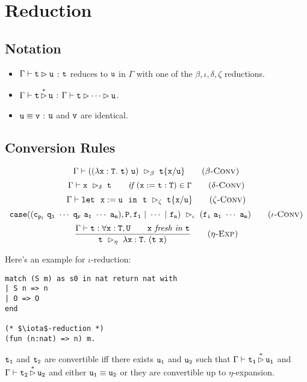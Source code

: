 \section{Reduction}

\subsection{Notation}
\begin{itemize}
    \item $\Gamma\vdash \tt t\rhd u$ : $\tt t$ reduces to $\tt u$ in $\Gamma$ with 
    one of the $\beta,\iota,\delta,\zeta$ reductions.
    \item $\Gamma\vdash \tt t\mathop{\rhd}\limits^* u$ : $\Gamma\vdash\tt t\rhd\cdots\rhd u$.
    \item $\tt u\equiv v$ : $\tt u$ and $\tt v$ are identical.
\end{itemize}

\subsection{Conversion Rules}
\begin{equation*}
    \Gamma\vdash\tt((\lambda x:T.\ t)\ u)\ \rhd_\beta\ t\{x/u\}
    \tag{\sc $\beta$-Conv}
\end{equation*}
\begin{equation*}
    \Gamma\vdash\tt x\ \rhd_\delta\ t\qquad \textit{if }(x:=t:T)\in\Gamma
    \tag{\sc $\delta$-Conv}
\end{equation*}
\begin{equation*}
\Gamma\vdash \tt let\ \ x:=u\ \ in\ \ t\ \rhd_\zeta\ t\{x/u\}
    \tag{\sc $\zeta$-Conv}
\end{equation*}
\begin{equation*}
    \tt case((c_{p_i}\ q_1\ \cdots\ q_r\ a_1\ \cdots\ a_m),P,f_1\ |\ \cdots\ |\ f_n)\ \rhd_\iota\ (f_i\ a_1\ \cdots\ a_m)
    \tag{\sc $\iota$-Conv}
\end{equation*}
\begin{equation*}
\frac{\Gamma\vdash \tt t:\forall x:T,U\qquad x\textit{ fresh in }t}
    {\tt t\ \rhd_\eta\ \lambda\tt x:T.\ (t\ x)}
    \tag{\sc $\eta$-Exp}
\end{equation*}

Here's an example for $\iota$-reduction:
\begin{center}
\begin{minipage}{0.6\textwidth}
\begin{verbatim}
match (S m) as s0 in nat return nat with
| S n => n
| O => O
end

(* $\iota$-reduction *)
(fun (n:nat) => n) m.
\end{verbatim}
\end{minipage}
\end{center}

\begin{Def}[Convertibility]
$\tt t_1$ and $\tt t_2$ are convertible iff there exists $\tt u_1$ and $\tt u_2$ such that 
$\Gamma\vdash \tt t_1\mathop{\rhd}\limits^* u_1$ and $\Gamma\vdash \tt t_2\mathop{\rhd}\limits^* u_2$ 
and either $\tt u_1\equiv u_2$ or they are convertible up to $\eta$-expansion.
\end{Def}

